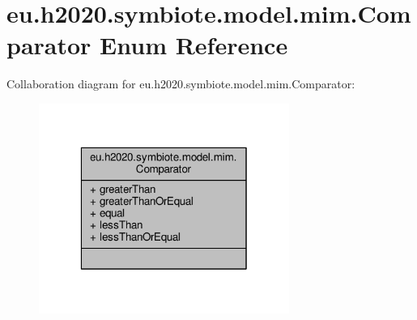 \hypertarget{enumeu_1_1h2020_1_1symbiote_1_1model_1_1mim_1_1Comparator}{}\section{eu.\+h2020.\+symbiote.\+model.\+mim.\+Comparator Enum Reference}
\label{enumeu_1_1h2020_1_1symbiote_1_1model_1_1mim_1_1Comparator}


Collaboration diagram for eu.\+h2020.\+symbiote.\+model.\+mim.\+Comparator\+:
\nopagebreak
\begin{figure}[H]
\begin{center}
\leavevmode
\includegraphics[width=232pt]{enumeu_1_1h2020_1_1symbiote_1_1model_1_1mim_1_1Comparator__coll__graph}
\end{center}
\end{figure}
